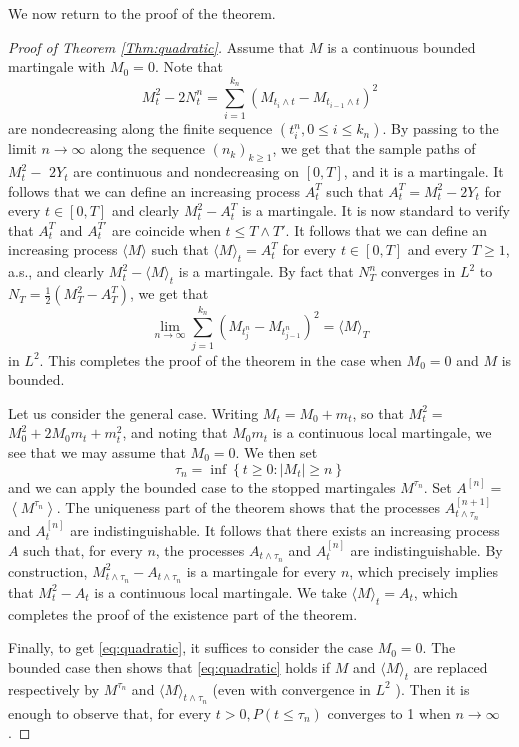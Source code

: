 \documentclass[twoside, 12pt]{book}
\numberwithin{equation}{chapter}
\def\geq{\geqslant}
\def\leq{\leqslant}
\begin{document}
	We now return to the proof of the theorem. 
	\begin{proof}[Proof of Theorem \ref{Thm:quadratic}]
		Assume that $M$ is a continuous bounded martingale with $M_0=0$. Note that 
		\[
		M_t^2-2 N_t^n = \sum_{i=1}^{k_n} (M_{t_i\wedge t}-M_{t_{i-1}\wedge t})^2
		\]
		are nondecreasing along the finite sequence $\left(t_i^n, 0 \leq i \leq k_n\right)$. By passing to the limit $n \rightarrow \infty$ along the sequence $\left(n_k\right)_{k \geq 1}$, we get that the sample paths of $M_t^2-$ $2 Y_t$ are continuous and  nondecreasing on $[0, T]$, and it is a martingale. It follows that we can define an increasing process $A^T_t$ such that $A^T_t=M_t^2-2Y_t$ for every $t \in[0, T]$ and clearly $M_t^2-A^{T}_t$ is a martingale. It is now standard to verify that $A^{T}_t$ and $A^{T'}_t$ are coincide when $t\leq T\wedge T'$. It follows that we can define an increasing process $\langle M \rangle$ such that $\langle M \rangle_t=A_t^{T}$ for every $t \in[0, T]$ and every $T \geq 1$, a.s., and clearly $M_t^2-\langle M \rangle_t$ is a martingale. By fact that $N_T^n$ converges in $L^2$ to $N_T=\frac{1}{2}\left(M_T^2-A_T^T\right)$, we get that
		$$
		\lim _{n \rightarrow \infty} \sum_{j=1}^{k_n}\left(M_{t_j^n}-M_{t_{j-1}^n}\right)^2=\langle M \rangle_T
		$$
		in $L^2$. This completes the proof of the theorem in the case when $M_0=0$ and $M$ is bounded.
		
		Let us consider the general case. Writing $M_t=M_0+m_t$, so that $M_t^2=$ $M_0^2+2 M_0 m_t+m_t^2$, and noting that $M_0 m_t$ is a continuous local martingale, we see that we may assume that $M_0=0$. We then set
		$$
		\tau_n=\inf \left\{t \geq 0:\left|M_t\right| \geq n\right\}
		$$
		and we can apply the bounded case to the stopped martingales $M^{\tau_n}$. Set $A^{[n]}=$ $\left\langle M^{\tau_n}\right\rangle$. The uniqueness part of the theorem shows that the processes $A_{t \wedge \tau_n}^{[n+1]}$ and $A_t^{[n]}$ are indistinguishable. It follows that there exists an increasing process $A$ such that, for every $n$, the processes $A_{t \wedge \tau_n}$ and $A_t^{[n]}$ are indistinguishable. By construction, $M_{t \wedge \tau_n}^2-A_{t \wedge \tau_n}$ is a martingale for every $n$, which precisely implies that $M_t^2-A_t$ is a continuous local martingale. We take $\langle M \rangle_t=A_t$, which completes the proof of the existence part of the theorem.
		
		Finally, to get \eqref{eq:quadratic}, it suffices to consider the case $M_0=0$. The bounded case then shows that \eqref{eq:quadratic} holds if $M$ and $\langle M \rangle_t$ are replaced respectively by $M^{\tau_n}$ and $\langle M \rangle_{t \wedge \tau_n}$ (even with convergence in $L^2$ ). Then it is enough to observe that, for every $t>0, P\left(t \leq \tau_n\right)$ converges to 1 when $n \rightarrow \infty$.
	\end{proof}
	
\end{document}
